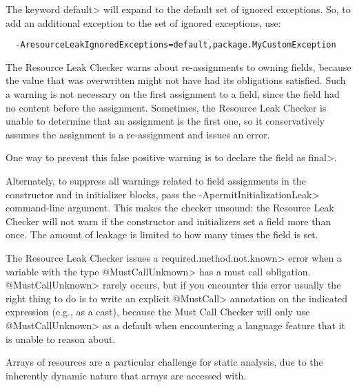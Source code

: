 The keyword \<default> will expand to the default set of ignored exceptions.  So,
to add an additional exception to the set of ignored exceptions, use:

\begin{verbatim}
  -AresourceLeakIgnoredExceptions=default,package.MyCustomException
\end{verbatim}



The Resource Leak Checker warns about re-assignments to owning fields,
because the value that was overwritten might not have had its obligations
satisfied.  Such a warning is not necessary on the first assignment to a
field, since the field had no content before the assignment.  Sometimes,
the Resource Leak Checker is unable to determine that an assignment is the
first one, so it conservatively assumes the assignment is a re-assignment
and issues an error.

One way to prevent this false positive warning is to declare the field as \<final>.

Alternately, to suppress all warnings related to field assignments in the
constructor and in initializer blocks, pass the
\<-ApermitInitializationLeak> command-line argument.  This makes the
checker unsound:  the Resource Leak Checker will not warn if the constructor
and initializers set a field more than once.  The amount of leakage is
limited to how many times the field is set.


The Resource Leak Checker issues a \<required.method.not.known> error
when a variable with the type \<@MustCallUnknown> has a must call obligation.
\<@MustCallUnknown> rarely occurs, but if you encounter this error usually
the right thing to do is to write an explicit \<@MustCall> annotation
on the indicated expression (e.g., as a cast), because the Must Call Checker
will only use \<@MustCallUnknown> as a default when encountering a language
feature that it is unable to reason about.

Arrays of resources are a particular challenge for static analysis, due to the inherently dynamic nature that arrays are accessed with.

